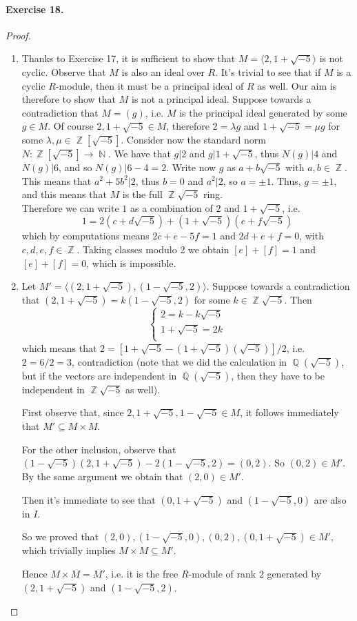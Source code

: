 \documentclass[12pt,a4paper]{report}
\theoremstyle{definition}
\theoremstyle{num.custom-title}
\DeclareMathOperator{\N}{\mathbb{N}}
\DeclareMathOperator{\Q}{\mathbb{Q}}
\DeclareMathOperator{\Z}{\mathbb{Z}}
\DeclareMathOperator{\sse}{\subseteq}
\begin{document}
\paragraph{Exercise 18.} 
\begin{proof}\ 
\begin{enumerate}
\item Thanks to Exercise 17, it is sufficient to show that $M= \langle 2, 1+\sqrt{-5} \rangle$ is not cyclic. Observe that $M$ is also an ideal over $R$. It's trivial to see that if $M$ is a cyclic $R$-module, then it must be a principal ideal of $R$ as well. Our aim is therefore to show that $M$ is not a principal ideal. Suppose towards a contradiction that $M=(g)$, i.e. $M$ is the principal ideal generated by some $g \in M$. Of course $2, 1+\sqrt{-5} \in M$, therefore $2=\lambda g$ and $1+\sqrt{-5}=\mu g$ for some $\lambda, \mu \in \Z[\sqrt{-5}]$. Consider now the standard norm $N: \Z[\sqrt{-5}] \to \N$. We have that $g|2$ and $g|1+\sqrt{-5}$, thus $N(g)|4$ and $N(g)|6$, and so $N(g)|6-4=2$. Write now $g$ as $a+b \sqrt{-5}$ with $a, b \in \Z$. This means that $a^2+5b^2 | 2$, thus $b=0$ and $a^2 | 2$, so $a=\pm 1$. Thus, $g= \pm 1$, and this means that $M$ is the full $\Z\sqrt{-5}$ ring.\\
Therefore we can write $1$ as a combination of $2$ and $1+\sqrt{-5}$, i.e.
\[
1=2(c+d\sqrt{-5})+(1+\sqrt{-5})(e+f\sqrt{-5})
\]
which by computations means $2c+e-5f=1$ and $2d+e+f=0$, with $c,d,e,f \in \Z$. Taking classes modulo 2 we obtain $[e]+[f]=1$ and $[e]+[f]=0$, which is impossible.
\item Let $M' = \langle(2,1+\sqrt{-5}),(1-\sqrt{-5},2)\rangle$.
Suppose towards a contradiction that $(2,1+\sqrt{-5})=k(1-\sqrt{-5},2)$ for some $k \in \Z\sqrt{-5}$. Then
\[
\begin{cases}
2=k-k\sqrt{-5}\\
1+\sqrt{-5}=2k\\
\end{cases}
\]
which means that $2=[1+\sqrt{-5}-(1+\sqrt{-5})(\sqrt{-5})]/2$, i.e. $2=6/2=3$, contradiction (note that we did the calculation in $\Q(\sqrt{-5})$, but if the vectors are independent in $\Q(\sqrt{-5})$, then they have to be independent in $\Z\sqrt{-5}$ as well).

First observe that, since $2,1+\sqrt{-5},1-\sqrt{-5} \in M$, it follows immediately that $M' \sse M \times M$.

For the other inclusion, observe that $(1-\sqrt{-5})(2,1+\sqrt{-5})-2(1-\sqrt{-5},2)=(0,2)$. So $(0,2) \in M'$. By the same argument we obtain that $(2,0) \in M'$. 

Then it's immediate to see that $(0,1+\sqrt{-5})$ and $(1-\sqrt{-5},0)$ are also in $I$. 

So we proved that $(2,0), (1-\sqrt{-5},0), (0,2), (0,1+\sqrt{-5}) \in M'$, which trivially implies $M \times M \sse M'$.

Hence $M \times M=M'$, i.e. it is the free $R$-module of rank $2$ generated by $(2,1+\sqrt{-5})$ and $(1-\sqrt{-5},2)$.
\end{enumerate}
\end{proof}
\end{document}
